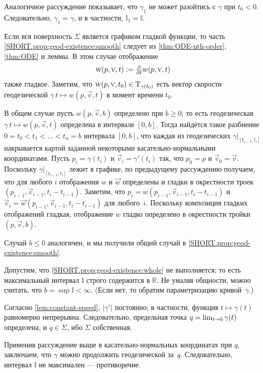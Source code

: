 Аналогичное рассуждение показывает, что $\gamma_1$ не может разойтись с $\gamma$ при $t_0<0$.
Следовательно, $\gamma_1=\gamma$, и в частности, $\mathbb{I}_1=\mathbb{I}$.

Если вся поверхность $\Sigma$ является графиком гладкой функции, то часть \ref{SHORT.prop:geod-existence:smooth} следует из \ref{thm:ODE-nth-order}, \ref{thm:ODE} и леммы.
В этом случае отображение
\[\text{\sc{w}}(p,\text{\sc{v}},t)\mathrel{:=}\tfrac{\partial}{\partial t}w(p,\text{\sc{v}},t)\] также гладкое.
Заметим, что $\text{\sc{w}}(p,\text{\sc{v}},t_0) \in \mathrm{T}_{\gamma(t_0)}$ есть вектор скорости геодезической $\gamma\:t\mapsto w(p,\vec v,t)$ в момент времени $t_0$.

В общем случае пусть $w(p,{\vec v},b)$ определено при $b\ge0$; то есть геодезическая $\gamma\:t\mapsto w(p,{\vec v},t)$ определена в интервале $[0,b]$.
Тогда найдётся такое разбиение $0=t_0<t_1<\dots<t_n=b$ интервала $[0,b]$, что каждая из геодезических $\gamma|_{[t_{i-1},t_i]}$ накрывается картой заданной некоторыми касательно-нормальными координатами.
Пусть $p_i=\gamma(t_i)$ и $\vec v_i=\gamma'(t_i)$ так, что $p_0=p$ и $\vec v_0=\vec v$.
Поскольку $\gamma|_{[t_{i-1},t_i]}$ лежит в графике, по предыдущему рассуждению получаем, что для любого $i$ отображения
$w$ и $\vec w$ определены и гладки в окрестности троек $(p_{i-1},\vec v_{i-1}, t_i-t_{i-1})$.
Заметим, что $p_i=w(p_{i-1},\vec v_{i-1},t_i-t_{i-1})$ и $\vec v_i=\vec w(p_{i-1},\vec v_{i-1},t_i-t_{i-1})$ для любого~$i$.
Поскольку композиция гладких отображений гладкая, отображение $w$ гладко определено в окрестности тройки $(p,\vec v, b)$.

Случай $b\le 0$ аналогичен, и мы получили общий случай в \ref{SHORT.prop:geod-existence:smooth}.

Допустим, что \ref{SHORT.prop:geod-existence:whole} не выполняется;
то есть максимальный интервал $\mathbb{I}$ строго содержится в $\mathbb{R}$.
Не умаляя общности, можно считать, что $b=\sup\mathbb{I}<\infty$.
(Если нет, то обратим параметризацию кривой~$\gamma$.)

{\sloppy

Согласно \ref{lem:constant-speed}, $|\gamma'|$ постоянно; в частности, функция $t\mapsto \gamma(t)$ равномерно непрерывна.
Следовательно, предельная точка
$q\z=\lim_{t\to b}\gamma(t)$
определена, и $q\in \Sigma$, ибо $\Sigma$ собственная.

}

Применив рассуждение выше в касательно-нормальных координатах при $q$, заключаем, что $\gamma$ можно продолжить геодезической за~$q$.
Следовательно, интервал $\mathbb{I}$ не максимален --- противоречие.
\qeds

